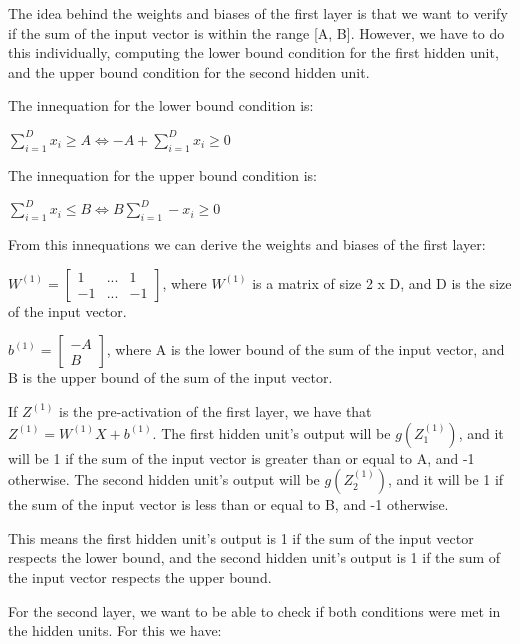\documentclass{article}
\begin{document}
\bigskip

The idea behind the weights and biases of the first layer is that we want to verify if the sum of the input vector is within the range [A, B].
However, we have to do this individually, computing the lower bound condition for the first hidden unit, 
and the upper bound condition for the second hidden unit.

\bigskip

The innequation for the lower bound condition is:

\bigskip

$ \sum_{i=1}^{D} x_i \geq A \iff -A + \sum_{i=1}^{D} x_i \geq 0$

The innequation for the upper bound condition is:

\bigskip

$ \sum_{i=1}^{D} x_i \leq B \iff B \sum_{i=1}^{D}- x_i \geq 0$

\bigskip

From this innequations we can derive the weights and biases of the first layer:

\bigskip

\( W^{(1)} = \begin{bmatrix}
    1  & ... & 1  \\
    -1 & ... & -1
\end{bmatrix}
\), where \(W^{(1)}\) is a matrix of size 2 x D, and D is the size of the input vector.

\(b^{(1)} = \begin{bmatrix}
    -A \\
    B
\end{bmatrix}
\), where A is the lower bound of the sum of the input vector, and B is the upper bound of the sum of the input vector. 

\bigskip

If $Z^{(1)}$ is the pre-activation of the first layer, we have that $Z^{(1)} = W^{(1)}X + b^{(1)}$.
The first hidden unit's output will be $g(Z^{(1)}_1)$, and it will be 1 if the sum of the input vector is greater than or equal to A, 
and -1 otherwise.
The second hidden unit's output will be $g(Z^{(1)}_2)$, and it will be 1 if the sum of the input vector is less than or equal to B, 
and -1 otherwise.

This means the first hidden unit's output is 1 if the sum of the input vector respects the lower bound, 
and the second hidden unit's output is 1 if the sum of the input vector respects the upper bound.

For the second layer, we want to be able to check if both conditions were met in the hidden units. For this we have:
\end{document}
